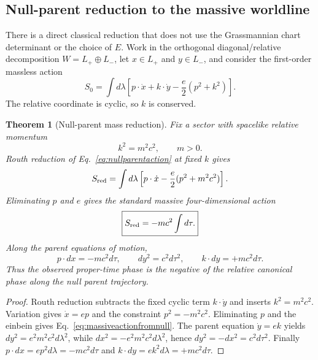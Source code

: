 \documentclass[11pt]{article}
\newtheorem{theorem}{Theorem}[section]
\theoremstyle{definition}\newtheorem{definition}[theorem]{Definition}
\theoremstyle{remark}\newtheorem{remark}[theorem]{Remark}\newtheorem{conjecture}[theorem]{Conjecture}
\begin{document}
\subsection{Null-parent reduction to the massive worldline}

There is a direct classical reduction that does not use the Grassmannian chart determinant or the choice of $E$. Work in the orthogonal diagonal/relative decomposition $W=L_+\oplus L_-$, let $x\in L_+$ and $y\in L_-$, and consider the first-order massless action
\begin{equation}\label{eq:nullparentaction}
 S_0=\int d\lambda\left[
 p\cdot\dot x+k\cdot\dot y-\frac e2(p^2+k^2)
 \right].
\end{equation}
The relative coordinate is cyclic, so $k$ is conserved.

\begin{theorem}[Null-parent mass reduction]\label{thm:nullparentmass}
Fix a sector with spacelike relative momentum
\begin{equation}
 k^2=m^2c^2,\qquad m>0.
\end{equation}
Routh reduction of Eq.~\eqref{eq:nullparentaction} at fixed $k$ gives
\begin{equation}
 S_{\rm red}
 =\int d\lambda\left[
 p\cdot\dot x-\frac e2(p^2+m^2c^2)
 \right].
\end{equation}
Eliminating $p$ and $e$ gives the standard massive four-dimensional action
\begin{equation}\label{eq:massiveactionfromnull}
 \boxed{S_{\rm red}=-mc^2\int d\tau.}
\end{equation}
Along the parent equations of motion,
\begin{equation}\label{eq:hiddenphase}
 p\cdot dx=-mc^2d\tau,\qquad
 dy^2=c^2d\tau^2,\qquad
 k\cdot dy=+mc^2d\tau.
\end{equation}
Thus the observed proper-time phase is the negative of the relative canonical phase along the null parent trajectory.
\end{theorem}

\begin{proof}
Routh reduction subtracts the fixed cyclic term $k\cdot\dot y$ and inserts $k^2=m^2c^2$. Variation gives $\dot x=ep$ and the constraint $p^2=-m^2c^2$. Eliminating $p$ and the einbein gives Eq.~\eqref{eq:massiveactionfromnull}. The parent equation $\dot y=ek$ yields $dy^2=e^2m^2c^2d\lambda^2$, while $dx^2=-e^2m^2c^2d\lambda^2$, hence $dy^2=-dx^2=c^2d\tau^2$. Finally $p\cdot dx=ep^2d\lambda=-mc^2d\tau$ and $k\cdot dy=ek^2d\lambda=+mc^2d\tau$.
\end{proof}
\end{document}
